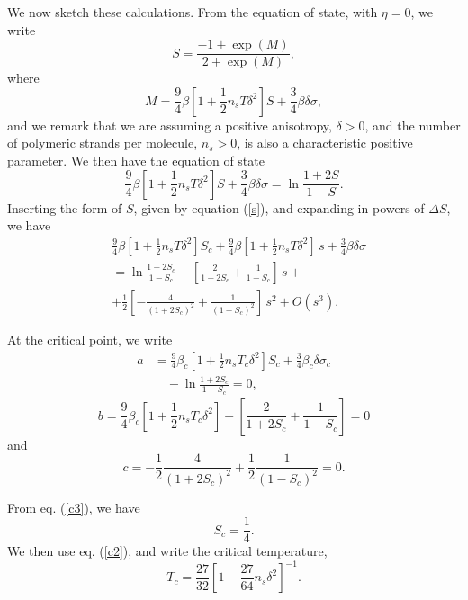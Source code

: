 \documentclass[aps,pre,reprint,amsmath,amssymbols,superscriptaddress,
nofootinbib]{revtex4-1}
\begin{document}
We now sketch these calculations. From the equation of state, with $\eta=0$,
we write%
\begin{equation}
S=\frac{-1+\exp\left(  M\right)  }{2+\exp\left(  M\right)  },\label{Seqstat}%
\end{equation}
where%
\begin{equation}
M=\frac{9}{4}\beta\left[  1+\frac{1}{2}n_{s}T\delta^{2}\right]  S+\frac{3}%
{4}\beta\delta\sigma,
\end{equation}
and we remark that we are assuming a positive anisotropy, $\delta>0$, and the
number of polymeric strands per molecule, $n_{s}>0$, is also a characteristic
positive parameter. We then have the equation of state%
\begin{equation}
\frac{9}{4}\beta\left[  1+\frac{1}{2}n_{s}T\delta^{2}\right]  S+\frac{3}%
{4}\beta\delta\sigma=\ln\frac{1+2S}{1-S}.
\end{equation}
Inserting the form of $S$, given by equation (\ref{s}), and expanding in
powers of $\Delta S$, we have%
\begin{align}
&\frac{9}{4}\beta\left[  1+\frac{1}{2}n_{s}T\delta^{2}\right]  S_{c}+\frac
{9}{4}\beta\left[  1+\frac{1}{2}n_{s}T\delta^{2}\right]  \,s+\frac{3}{4}%
\beta\delta\sigma
\nonumber \\ &
=\ln\frac{1+2S_{c}}{1-S_{c}}+\left[  \frac{2}{1+2S_{c}}+\frac{1}{1-S_{c}%
}\right]  \,s+
\nonumber \\ &
+\frac{1}{2}\left[  -\frac{4}{\left(  1+2S_{c}\right)  ^{2}}+\frac{1}{\left(
1-S_{c}\right)  ^{2}}\right]  \,s^{2}+O\left(  s^{3}\right)  .
\end{align}

At the critical point, we write%
\begin{align}
a&=\frac{9}{4}\beta_{c}\left[  1+\frac{1}{2}n_{s}T_{c}\delta^{2}\right]
S_{c}+\frac{3}{4}\beta_{c}\delta\sigma_{c}
\nonumber \\ & \quad
-\ln\frac{1+2S_{c}}{1-S_{c}%
}=0,\label{c1}%
\end{align}%
\begin{equation}
b=\frac{9}{4}\beta_{c}\left[  1+\frac{1}{2}n_{s}T_{c}\delta^{2}\right]
-\left[  \frac{2}{1+2S_{c}}+\frac{1}{1-S_{c}}\right]  =0\label{c2}%
\end{equation}
and%
\begin{equation}
c=-\frac{1}{2}\frac{4}{\left(  1+2S_{c}\right)  ^{2}}+\frac{1}{2}\frac
{1}{\left(  1-S_{c}\right)  ^{2}}=0.\label{c3}%
\end{equation}


From eq. (\ref{c3}), we have%
\begin{equation}
S_{c}=\frac{1}{4}.
\end{equation}
We then use eq. (\ref{c2}), and write the critical temperature,%
\begin{equation}
T_{c}=\frac{27}{32}\left[  1-\frac{27}{64}n_{s}\delta^{2}\right]  ^{-1}.
\end{equation}
\end{document}

